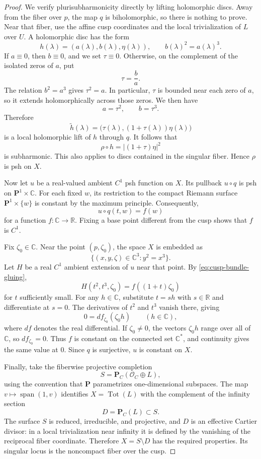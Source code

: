 \documentclass[11pt]{amsart}
\theoremstyle{definition}
\theoremstyle{remark}
\numberwithin{equation}{section}
\newcommand{\C}{\mathbb C}
\newcommand{\R}{\mathbb R}
\newcommand{\PP}{\mathbf P}
\newcommand{\OO}{\mathcal O}
\newcommand{\Tot}{\operatorname{Tot}}
\begin{document}
\begin{proof}
We verify plurisubharmonicity directly by lifting holomorphic
discs. Away from the fiber over $p$, the map $q$ is
biholomorphic, so there is nothing to prove. Near that fiber,
use the affine cusp coordinates and the local trivialization
of $L$ over $U$. A holomorphic disc has the form
\[
 h(\lambda)=(a(\lambda),b(\lambda),\eta(\lambda)),
 \qquad b(\lambda)^2=a(\lambda)^3.
\]
If $a\equiv0$, then $b\equiv0$, and we set $\tau\equiv0$.
Otherwise, on the complement of the isolated zeros of $a$, put
\[
 \tau=\frac{b}{a}.
\]
The relation $b^2=a^3$ gives $\tau^2=a$. In particular,
$\tau$ is bounded near each zero of $a$, so it extends
holomorphically across those zeros. We then have
\[
 a=\tau^2,\qquad b=\tau^3.
\]
Therefore
\[
 \widetilde h(\lambda)
 =
 \bigl(\tau(\lambda),(1+\tau(\lambda))\eta(\lambda)\bigr)
\]
is a local holomorphic lift of $h$ through $q$. It follows that
\[
 \rho\circ h
 =
 \bigl|(1+\tau)\eta\bigr|^2
\]
is subharmonic. This also applies to discs contained in the
singular fiber. Hence $\rho$ is psh on $X$.

Now let $u$ be a real-valued ambient $C^1$ psh function on $X$.
Its pullback $u\circ q$ is psh on $\PP^1\times\C$.
For each fixed $w$, its restriction to the compact Riemann
surface $\PP^1\times\{w\}$ is constant by the maximum principle.
Consequently,
\[
 u\circ q(t,w)=f(w)
\]
for a function $f:\C\to\R$. Fixing a base point different from
the cusp shows that $f$ is $C^1$.

Fix $\zeta_0\in\C$. Near the point $(p,\zeta_0)$, the space $X$
is embedded as
\[
 \{(x,y,\zeta)\in\C^3:y^2=x^3\}.
\]
Let $H$ be a real $C^1$ ambient extension of $u$ near that
point. By \eqref{eq:cusp-bundle-gluing},
\[
 H(t^2,t^3,\zeta_0)=f((1+t)\zeta_0)
\]
for $t$ sufficiently small. For any $h\in\C$, substitute
$t=sh$ with $s\in\R$ and differentiate at $s=0$.
The derivatives of $t^2$ and $t^3$ vanish there, giving
\[
 0=df_{\zeta_0}(\zeta_0h)
 \qquad(h\in\C),
\]
where $df$ denotes the real differential.
If $\zeta_0\ne0$, the vectors $\zeta_0h$ range over all of
$\C$, so $df_{\zeta_0}=0$. Thus $f$ is constant on the connected
set $\C^*$, and continuity gives the same value at $0$.
Since $q$ is surjective, $u$ is constant on $X$.

Finally, take the fiberwise projective completion
\[
 S=\PP_C(\OO_C\oplus L),
\]
using the convention that $\PP$ parametrizes one-dimensional
subspaces. The map $v\mapsto\operatorname{span}(1,v)$ identifies
$X=\Tot(L)$ with the complement of the infinity section
\[
 D=\PP_C(L)\subset S.
\]
The surface $S$ is reduced, irreducible, and projective, and
$D$ is an effective Cartier divisor: in a local trivialization
near infinity it is defined by the vanishing of the reciprocal
fiber coordinate. Therefore $X=S\setminus D$ has the required
properties. Its singular locus is the noncompact fiber over
the cusp.
\end{proof}
\end{document}
